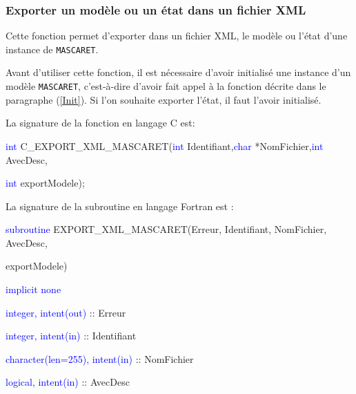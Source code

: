 \documentclass[a4paper,11pt]{article}
\begin{document}
\subsubsection{Exporter un mod\`ele ou un \'etat dans un fichier XML}

 Cette fonction permet d'exporter dans un fichier XML, le mod\`ele ou l'\'etat d'une instance de \texttt{MASCARET}.
 
 \vspace{0.5cm}
 
 Avant d'utiliser cette fonction, il est n\'ecessaire d'avoir initialis\'e une instance d'un mod\`ele \texttt{MASCARET}, c'est-\`a-dire d'avoir fait appel \`a la fonction d\'ecrite dans le paragraphe (\ref{Init}). Si l'on souhaite exporter l'\'etat, il faut l'avoir initialis\'e.
 
 \vspace{0.5cm}
 
  La signature de la fonction en langage C est:
 
 \vspace{0.5cm}
 
 \textcolor{blue}{int} C\_EXPORT\_XML\_MASCARET(\textcolor{blue}{int} Identifiant,\textcolor{blue}{char} *NomFichier,\textcolor{blue}{int} AvecDesc,
 
 \textcolor{blue}{int} exportModele);
 
 \vspace{0.5cm}
 
 La signature de la subroutine en langage Fortran est :
 
 \vspace{0.5cm}
 
    \textcolor{blue}{subroutine} EXPORT\_XML\_MASCARET(Erreur, Identifiant, NomFichier, AvecDesc,
    
     exportModele)
    
        \hspace{1cm}\textcolor{blue}{implicit none}                 
        
        \hspace{1cm} \textcolor{blue}{integer, intent(out)} :: Erreur
        
        \hspace{1cm} \textcolor{blue}{integer, intent(in)} :: Identifiant
        
        \hspace{1cm} \textcolor{blue}{character(len=255), intent(in)} :: NomFichier
        
        \hspace{1cm} \textcolor{blue}{logical, intent(in)} :: AvecDesc
        
\end{document}
